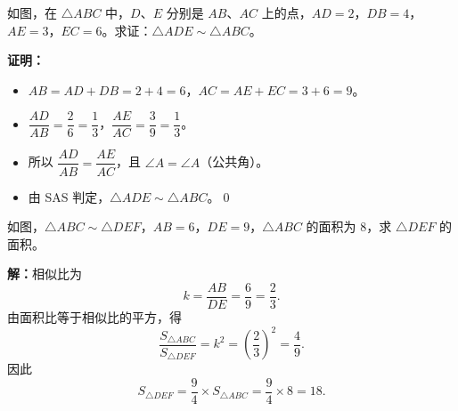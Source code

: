 \documentclass[12pt, a4paper]{ctexart}
\begin{document}
\begin{examplebox}
如图，在 $\triangle ABC$ 中，$D$、$E$ 分别是 $AB$、$AC$ 上的点，$AD=2$，$DB=4$，$AE=3$，$EC=6$。求证：$\triangle ADE\sim\triangle ABC$。

\medskip
\begin{center}
\end{center}
\end{examplebox}

\textbf{证明：}
\begin{itemize}[nosep]
  \item $AB=AD+DB=2+4=6$，$AC=AE+EC=3+6=9$。
  \item $\dfrac{AD}{AB}=\dfrac{2}{6}=\dfrac{1}{3}$，$\dfrac{AE}{AC}=\dfrac{3}{9}=\dfrac{1}{3}$。
  \item 所以 $\dfrac{AD}{AB}=\dfrac{AE}{AC}$，且 $\angle A=\angle A$（公共角）。
  \item 由 SAS 判定，$\triangle ADE\sim\triangle ABC$。\qed
\end{itemize}

\begin{examplebox}
如图，$\triangle ABC\sim\triangle DEF$，$AB=6$，$DE=9$，$\triangle ABC$ 的面积为 $8$，求 $\triangle DEF$ 的面积。
\end{examplebox}

\textbf{解：}相似比为
\[
k=\frac{AB}{DE}=\frac{6}{9}=\frac{2}{3}.
\]
由面积比等于相似比的平方，得
\[
\frac{S_{\triangle ABC}}{S_{\triangle DEF}}=k^2=\left(\frac{2}{3}\right)^2=\frac{4}{9}.
\]
因此
\[
S_{\triangle DEF}=\frac{9}{4}\times S_{\triangle ABC}=\frac{9}{4}\times 8=\boxed{18}.
\]
\end{document}
